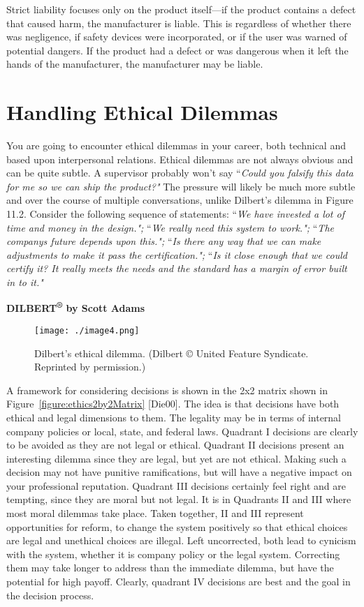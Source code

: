 Strict liability focuses only on the product itself---if the product
contains a defect that caused harm, the manufacturer is liable. This is
regardless of whether there was negligence, if safety devices were
incorporated, or if the user was warned of potential dangers. If the
product had a defect or was dangerous when it left the hands of the
manufacturer, the manufacturer may be liable.

\section{Handling Ethical Dilemmas}
\label{section:handling-ethical-dilemmas}

You are going to encounter ethical dilemmas in your career, both
technical and based upon interpersonal relations. Ethical dilemmas are
not always obvious and can be quite subtle. A supervisor probably won't
say ``\emph{Could you falsify this data for me so we can ship the
product?"} The pressure will likely be much more subtle and over the
course of multiple conversations, unlike Dilbert's dilemma in Figure
11.2. Consider the following sequence of statements: ``\emph{We have
invested a lot of time and money in the design.";} ``\emph{We really
need this system to work.";} ``\emph{The company\textquotesingle s
future depends upon this.";} ``\emph{Is there any way that we can make
adjustments to make it pass the certification.";} ``\emph{Is it close
enough that we could certify it? It really meets the needs and the
standard has a margin of error built in to it."}

\textbf{DILBERT\textsuperscript{®} by Scott Adams}
\begin{figure}[h]
\texttt{[image: ./image4.png]}
\caption{Dilbert's ethical dilemma. (Dilbert © United
Feature Syndicate. Reprinted by permission.)}
\label{figure:dilberEthics}
\end{figure}


A framework for considering decisions is shown in the 2x2 matrix shown
in Figure~\ref{figure:ethics2by2Matrix} {[}Die00{]}. The idea is that decisions have both ethical
and legal dimensions to them. The legality may be in terms of internal
company policies or local, state, and federal laws. Quadrant I decisions
are clearly to be avoided as they are not legal or ethical. Quadrant II
decisions present an interesting dilemma since they are legal, but yet
are not ethical. Making such a decision may not have punitive
ramifications, but will have a negative impact on your professional
reputation. Quadrant III decisions certainly feel right and are
tempting, since they are moral but not legal. It is in Quadrants II and
III where most moral dilemmas take place. Taken together, II and III
represent opportunities for reform, to change the system positively so
that ethical choices are legal and unethical choices are illegal. Left
uncorrected, both lead to cynicism with the system, whether it is
company policy or the legal system. Correcting them may take longer to
address than the immediate dilemma, but have the potential for high
payoff. Clearly, quadrant IV decisions are best and the goal in the
decision process.

